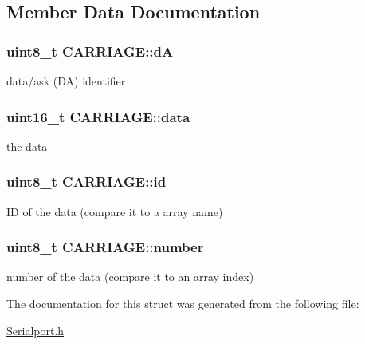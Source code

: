 \subsection{Member Data Documentation}
\hypertarget{struct_c_a_r_r_i_a_g_e_a7b462035ed4963a2a57b0e0e4adee637}{
\subsubsection[{d\-A}]{\setlength{\rightskip}{0pt plus 5cm}uint8\-\_\-t C\-A\-R\-R\-I\-A\-G\-E\-::d\-A}}\label{struct_c_a_r_r_i_a_g_e_a7b462035ed4963a2a57b0e0e4adee637}
data/ask (D\-A) identifier \hypertarget{struct_c_a_r_r_i_a_g_e_a8fde33d8c82ca9f730e4bfb46dc33764}{
\subsubsection[{data}]{\setlength{\rightskip}{0pt plus 5cm}uint16\-\_\-t C\-A\-R\-R\-I\-A\-G\-E\-::data}}\label{struct_c_a_r_r_i_a_g_e_a8fde33d8c82ca9f730e4bfb46dc33764}
the data \hypertarget{struct_c_a_r_r_i_a_g_e_a5472d5cf9356b01a56b2a3326014488b}{
\subsubsection[{id}]{\setlength{\rightskip}{0pt plus 5cm}uint8\-\_\-t C\-A\-R\-R\-I\-A\-G\-E\-::id}}\label{struct_c_a_r_r_i_a_g_e_a5472d5cf9356b01a56b2a3326014488b}
I\-D of the data (compare it to a array name) \hypertarget{struct_c_a_r_r_i_a_g_e_a0180ffaa7faf81664b6404f0108cea4f}{
\subsubsection[{number}]{\setlength{\rightskip}{0pt plus 5cm}uint8\-\_\-t C\-A\-R\-R\-I\-A\-G\-E\-::number}}\label{struct_c_a_r_r_i_a_g_e_a0180ffaa7faf81664b6404f0108cea4f}
number of the data (compare it to an array index) 

The documentation for this struct was generated from the following file\-:\begin{DoxyCompactItemize}
\item 
\hyperlink{_serialport_8h}{Serialport.\-h}\end{DoxyCompactItemize}
